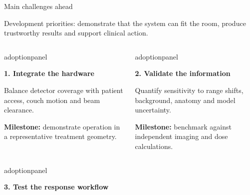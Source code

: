 \documentclass[aspectratio=169,11pt]{beamer}
\begin{document}
\begin{frame}{Main challenges ahead}

{\small Development priorities: demonstrate that the system can fit the room,
produce trustworthy results and support clinical action.\par}
\vspace{0.18cm}
\begin{columns}[T,onlytextwidth]
\begin{beamercolorbox}[sep=6pt,wd=\linewidth]{adoptionpanel}
\begin{minipage}[t][1.65cm][t]{\linewidth}\raggedright
{\footnotesize\bfseries\color{crBlue}1. Integrate the hardware\par}
\vspace{0.07cm}
{\scriptsize Balance detector coverage with patient access, couch motion and beam clearance.\par\vspace{0.08cm}\textbf{Milestone:} demonstrate operation in a representative treatment geometry.\par}
\end{minipage}
\end{beamercolorbox}
\begin{beamercolorbox}[sep=6pt,wd=\linewidth]{adoptionpanel}
\begin{minipage}[t][1.65cm][t]{\linewidth}\raggedright
{\footnotesize\bfseries\color{crBlue}2. Validate the information\par}
\vspace{0.07cm}
{\scriptsize Quantify sensitivity to range shifts, background, anatomy and model uncertainty.\par\vspace{0.08cm}\textbf{Milestone:} benchmark against independent imaging and dose calculations.\par}
\end{minipage}
\end{beamercolorbox}
\end{columns}
\par\vspace{0.22cm}
\begin{columns}[T,onlytextwidth]
\begin{beamercolorbox}[sep=6pt,wd=\linewidth]{adoptionpanel}
\begin{minipage}[t][1.65cm][t]{\linewidth}\raggedright
{\footnotesize\bfseries\color{crBlue}3. Test the response workflow\par}

\end{minipage}
\end{beamercolorbox}
\end{columns}
\end{frame}
\end{document}
